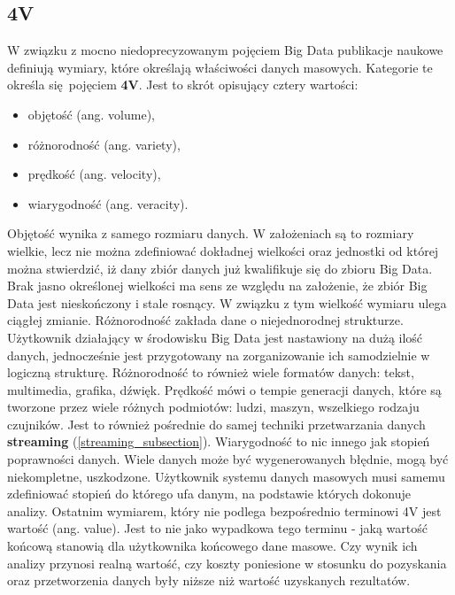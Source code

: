 \subsection{4V}
W związku z mocno niedoprecyzowanym pojęciem Big Data publikacje naukowe definiują wymiary, które określają właściwości danych masowych\cite{big_data_great_services}. Kategorie te określa się pojęciem \textbf{4V}. Jest to skrót opisujący cztery wartości:
\begin{itemize}
	\item objętość (ang. volume),
	\item różnorodność (ang. variety),
	\item prędkość (ang. velocity),
	\item wiarygodność (ang. veracity).
\end{itemize}
Objętość wynika z samego rozmiaru danych. W założeniach są to rozmiary wielkie, lecz nie można zdefiniować dokładnej wielkości oraz jednostki od której można stwierdzić, iż dany zbiór danych już kwalifikuje się do zbioru Big Data. Brak jasno określonej wielkości ma sens ze względu na założenie, że zbiór Big Data jest nieskończony i stale rosnący. W związku z tym wielkość wymiaru ulega ciągłej zmianie.\newline
Różnorodność zakłada dane o niejednorodnej strukturze. Użytkownik działający w środowisku Big Data jest nastawiony na dużą ilość danych, jednocześnie jest przygotowany na zorganizowanie ich samodzielnie w logiczną strukturę. Różnorodność to również wiele formatów danych: tekst, multimedia, grafika, dźwięk.\newline
Prędkość mówi o tempie generacji danych, które są tworzone przez wiele różnych podmiotów: ludzi, maszyn, wszelkiego rodzaju czujników. Jest to również pośrednie do samej techniki przetwarzania danych \textbf{streaming} (\ref{streaming_subsection}).\newline
Wiarygodność to nic innego jak stopień poprawności danych. Wiele danych może być wygenerowanych błędnie, mogą być niekompletne, uszkodzone. Użytkownik systemu danych masowych musi samemu zdefiniować stopień do którego ufa danym, na podstawie których dokonuje analizy.\newline
Ostatnim wymiarem, który nie podlega bezpośrednio terminowi 4V jest wartość (ang. value). Jest to nie jako wypadkowa tego terminu - jaką wartość końcową stanowią dla użytkownika końcowego dane masowe. Czy wynik ich analizy przynosi realną wartość, czy koszty poniesione w stosunku do pozyskania oraz przetworzenia danych były niższe niż wartość uzyskanych rezultatów.
